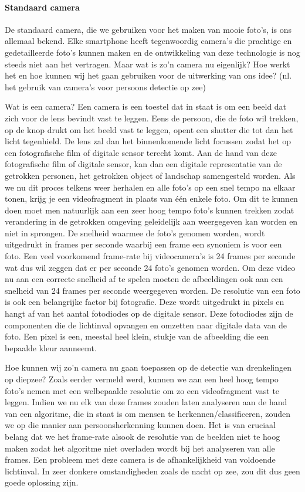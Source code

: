 \paragraph{Standaard camera}

De standaard camera, die we gebruiken voor het maken van mooie foto's, is ons allemaal bekend. Elke smartphone heeft tegenwoordig camera's die prachtige en gedetailleerde foto's kunnen maken en de ontwikkeling van deze technologie is nog steeds niet aan het vertragen. Maar wat is zo'n camera nu eigenlijk? Hoe werkt het en hoe kunnen wij het gaan gebruiken voor de uitwerking van ons idee? (nl. het gebruik van camera's voor persoons detectie op zee)

Wat is een camera? Een camera is een toestel dat in staat is om een beeld dat zich voor de lens bevindt vast te leggen. Eens de persoon, die de foto wil trekken, op de knop drukt om het beeld vast te leggen, opent een shutter die tot dan het licht tegenhield. De lens zal dan het binnenkomende licht focussen zodat het op een fotografische film of digitale sensor terecht komt. Aan de hand van deze fotografische film of digitale sensor, kan dan een digitale representatie van de getrokken personen, het getrokken object of landschap samengesteld worden. Als we nu dit proces telkens weer herhalen en alle foto's op een snel tempo na elkaar tonen, krijg je een videofragment in plaats van één enkele foto. Om dit te kunnen doen moet men natuurlijk aan een zeer hoog tempo foto's kunnen trekken zodat verandering in de getrokken omgeving geleidelijk aan weergegeven kan worden en niet in sprongen. De snelheid waarmee de foto's genomen worden, wordt uitgedrukt in frames per seconde waarbij een frame een synoniem is voor een foto. Een veel voorkomend frame-rate bij videocamera's is 24 frames per seconde wat dus wil zeggen dat er per seconde 24 foto's genomen worden. Om deze video nu aan een correcte snelheid af te spelen moeten de afbeeldingen ook aan een snelheid van 24 frames per seconde weergegeven worden. De resolutie van een foto is ook een belangrijke factor bij fotografie. Deze wordt uitgedrukt in pixels en hangt af van het aantal fotodiodes op de digitale sensor. Deze fotodiodes zijn de componenten die de lichtinval opvangen en omzetten naar digitale data van de foto. Een pixel is een, meestal heel klein, stukje van de afbeelding die een bepaalde kleur aanneemt. \autocite{DigitalCameras}


Hoe kunnen wij zo'n camera nu gaan toepassen op de detectie van drenkelingen op diepzee? Zoals eerder vermeld werd, kunnen we aan een heel hoog tempo foto's nemen met een welbepaalde resolutie om zo een videofragment vast te leggen. Indien we nu elk van deze frames zouden laten analyseren aan de hand van een algoritme, die in staat is om mensen te herkennen/classificeren, zouden we op die manier aan persoonsherkenning kunnen doen. Het is van cruciaal belang dat we het frame-rate alsook de resolutie van de beelden niet te hoog maken zodat het algoritme niet overladen wordt bij het analyseren van alle frames. Een probleem met deze camera is de afhankelijkheid van voldoende lichtinval. In zeer donkere omstandigheden zoals de nacht op zee, zou dit dus geen goede oplossing zijn. 


